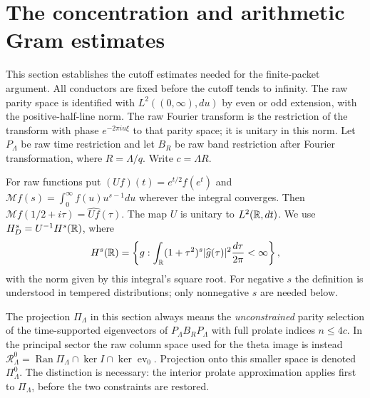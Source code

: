 \section{The concentration and arithmetic Gram estimates}
\label{sec:cutoff-estimates}
This section establishes the cutoff estimates needed for the finite-packet
argument. All conductors are fixed before the cutoff tends to infinity.
The raw parity space is identified with $L^2((0,\infty),du)$ by even
or odd extension, with the positive-half-line norm. The raw Fourier
transform is the restriction of the transform with phase
$e^{-2\pi iu\xi}$ to that parity space; it is unitary in this norm.
Let $P_\Lambda$ be raw time restriction and let $B_R$ be raw band
restriction after Fourier transformation, where $R=\Lambda/q$.
Write $c=\Lambda R$.

For raw functions put $(Uf)(t)=e^{t/2}f(e^t)$ and
$\mathcal Mf(s)=\int_0^\infty f(u)u^{s-1}du$ wherever the integral
converges. Then $\mathcal Mf(1/2+i\tau)=\widehat{Uf}(\tau)$.
The map $U$ is unitary to $L^2(\mathbb R,dt)$.
We use $H_D^s=U^{-1}H^s(\mathbb R)$, where
\[
 H^s(\mathbb R)=\left\{g:\int_\mathbb R(1+\tau^2)^s
                     |\widehat g(\tau)|^2\frac{d\tau}{2\pi}<\infty\right\},
\]
with the norm given by this integral's square root. For negative $s$
the definition is understood in tempered distributions; only
nonnegative $s$ are needed below.

The projection $\Pi_\Lambda$ in this section always means the
\emph{unconstrained} parity selection of the time-supported eigenvectors
of $P_\Lambda B_RP_\Lambda$ with full prolate indices $n\leq4c$.
In the principal sector the raw column space used for the theta image
is instead $\mathcal R_\Lambda^0=\operatorname{Ran}\Pi_\Lambda
\cap\ker I\cap\ker\operatorname{ev}_0$.
Projection onto this smaller space is denoted $\Pi_\Lambda^0$.
The distinction is necessary: the interior prolate approximation
applies first to $\Pi_\Lambda$, before the two constraints are restored.

